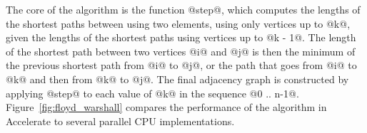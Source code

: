 %
%
%
%
%
%
%

%

The core of the algorithm is the function @step@, which computes the lengths of
the shortest paths between using two elements, using only vertices up to @k@,
given the lengths of the shortest paths using vertices up to @k - 1@. The length
of the shortest path between two vertices @i@ and @j@ is then the minimum of the
previous shortest path from @i@ to @j@, or the path that goes from @i@ to @k@
and then from @k@ to @j@. The final adjacency graph is constructed by applying
@step@ to each value of @k@ in the sequence @0 .. n-1@.
Figure~\ref{fig:floyd_warshall} compares the performance of the algorithm in
Accelerate to several parallel CPU implementations.

